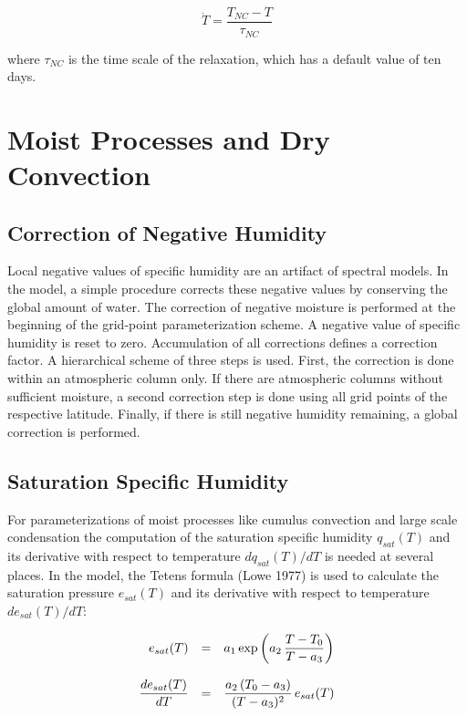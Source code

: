 \begin{equation}
\dot{T}=\frac{T_{NC}-T}{\tau_{NC}}
\end{equation}

where $\tau_{NC}$ is the time scale of the relaxation, which has a default value of ten days.

\newpage

\section{Moist Processes and Dry Convection}

\subsection{Correction of Negative Humidity}

Local negative values of specific humidity are an
artifact of spectral models. In the model, a simple
procedure corrects these negative values by
conserving the global amount of water. The correction of negative moisture is performed at the
beginning of the grid-point
parameterization scheme. A negative
value of specific humidity is reset to zero. 
Accumulation of all corrections defines a correction
factor. A hierarchical scheme of three steps is used. First, the correction is done within an
atmospheric column only. If there are atmospheric columns without sufficient moisture, a
second correction step is done using all grid points of the respective latitude. Finally, if there is
still negative humidity remaining, a global correction is performed.

\subsection{Saturation Specific Humidity}

For parameterizations of  moist processes like cumulus
convection and large scale condensation
the computation of the saturation specific humidity
$q_{sat}(T)$ and its derivative with respect
to temperature $dq_{sat}(T)/dT$ is needed at several
places. In
the model, the Tetens formula  (Lowe 1977)  is used to
calculate the saturation pressure
$e_{sat} (T)$ and its derivative with respect to
temperature $de_{sat}(T)/dT$:

\begin{equation}
\begin{array}{rcl}
\displaystyle e_{sat}(T) & = & \displaystyle a_1 \exp{\left(a_2 \,
\frac{T-T_0}{T-a_3}\right)} \\
&& \\
\displaystyle \frac{de_{sat}(T)}{dT} & = & \displaystyle \frac{a_2 \, (T_0
- a_3)}{(T-a_3)^2} \, e_{sat}(T) 
\end{array}
\end{equation}

